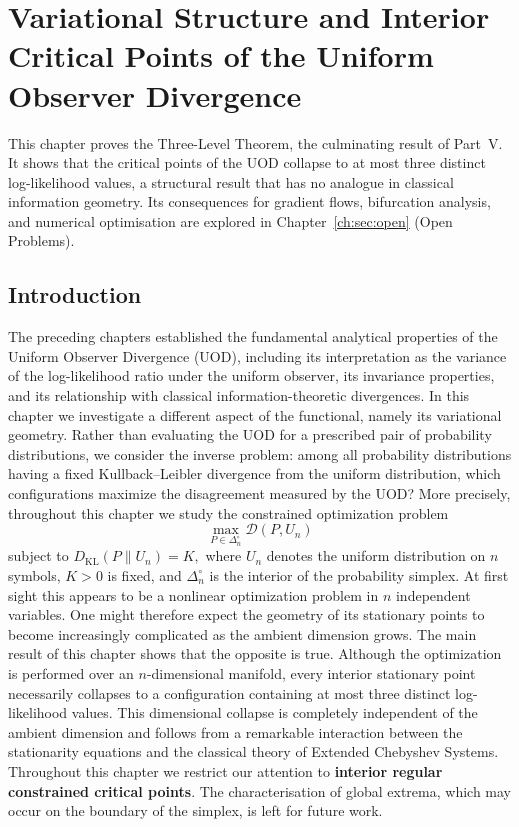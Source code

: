 \chapter[Variational Structure]{Variational Structure and Interior Critical Points of the Uniform Observer Divergence}\label{ch:sec:variational-uod}

This chapter proves the Three-Level Theorem, the culminating result of Part~V. It shows that the critical points of the UOD collapse to at most three distinct log-likelihood values, a structural result that has no analogue in classical information geometry. Its consequences for gradient flows, bifurcation analysis, and numerical optimisation are explored in Chapter~\ref{ch:sec:open} (Open Problems).


\section{Introduction}\label{ch:sec:introduction-variational}
The preceding chapters established the fundamental analytical properties of the Uniform Observer Divergence (UOD), including its interpretation as the variance of the log-likelihood ratio under the uniform observer, its invariance properties, and its relationship with classical information-theoretic divergences.
In this chapter we investigate a different aspect of the functional, namely its variational geometry.
Rather than evaluating the UOD for a prescribed pair of probability distributions, we consider the inverse problem: among all probability distributions having a fixed Kullback--Leibler divergence from the uniform distribution, which configurations maximize the disagreement measured by the UOD?
More precisely, throughout this chapter we study the constrained optimization problem
\[
\max_{P\in\Delta_n^\circ}
\mathcal D(P,U_n)
\]
subject to
$D_{\mathrm{KL}}(P\|U_n)=K,$
where \(U_n\) denotes the uniform distribution on \(n\) symbols, \(K>0\) is fixed, and \(\Delta_n^\circ\) is the interior of the probability simplex.
At first sight this appears to be a nonlinear optimization problem in \(n\) independent variables. One might therefore expect the geometry of its stationary points to become increasingly complicated as the ambient dimension grows.
The main result of this chapter shows that the opposite is true.
Although the optimization is performed over an \(n\)-dimensional manifold, every interior stationary point necessarily collapses to a configuration containing at most three distinct log-likelihood values.
This dimensional collapse is completely independent of the ambient dimension and follows from a remarkable interaction between the stationarity equations and the classical theory of Extended Chebyshev Systems.
Throughout this chapter we restrict our attention to \textbf{interior regular constrained critical points}. The characterisation of global extrema, which may occur on the boundary of the simplex, is left for future work.
